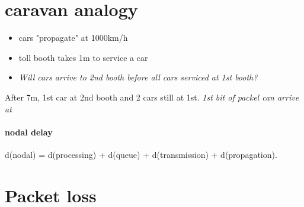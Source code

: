 \section{caravan analogy}
\begin{itemize}
	\item cars "propagate" at 1000km/h
	\item toll booth takes 1m to service a car
	\item \textit{Will cars arrive to 2nd booth before all cars serviced at 1st booth?}
\end{itemize}
After 7m, 1st car at 2nd booth and 2 cars still at 1st.
\textit{1st bit of packel can arrive at} %


\paragraph{nodal delay} d(nodal) = d(processing) + d(queue) + d(transmission) + d(propagation).


\section{Packet loss}

